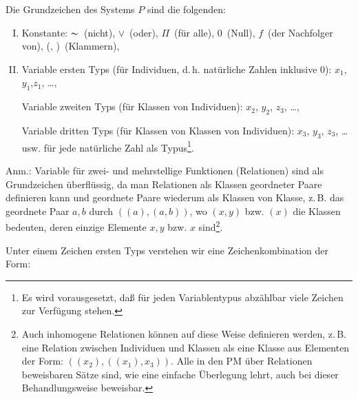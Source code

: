 \documentclass[draft]{scrartcl}
\begin{document}
\label{ersetzungdurchklassen}
Die Grundzeichen des Systems $P$ sind die folgenden:

\begin{enumerate}[I.]
	\item Konstante: \glqq $\thicksim$\grqq\ (nicht),
		\glqq$\lor$\grqq\ (oder), \glqq$\Pi{}$\grqq\ (für alle),
		\glqq $0$\grqq\ (Null), \glqq$f$\grqq\ (der Nachfolger
		von), \glqq(\grqq, \glqq)\grqq\ (Klammern),

	\item Variable ersten Typs (für Individuen, d.\,h. 
		natürliche Zahlen inklusive 0):
		\glqq$x_1$\grqq, \glqq$y_1$\grqq,\glqq$z_1$\grqq, \dots,

		Variable zweiten Typs (für Klassen von Individuen):
		\glqq$x_2$\grqq, \glqq$y_2$\grqq, \glqq$z_3$\grqq, \dots,

		Variable dritten Typs (für Klassen von Klassen von
		Individuen): \glqq$x_3$\grqq, \glqq$y_3$\grqq,
		\glqq$z_3$\grqq, \dots usw. für jede natürliche Zahl
		als Typus\footnote{Es wird vorausgesetzt, daß für
		jeden Variablentypus abzählbar viele Zeichen zur Verfügung stehen.}.
\end{enumerate}

Anm.: Variable für zwei- und mehrstellige Funktionen
(Relationen) sind als Grundzeichen überflüssig, da man
Relationen als Klassen geordneter Paare definieren kann
und geordnete Paare wiederum als Klassen von Klasse, z.\,B.
das geordnete Paar $a, b$ durch $\left(\left(a\right),
\left(a, b\right)\right)$, wo $\left(x, y\right)$ bzw. $\left(x\right)$ die
Klassen bedeuten, deren einzige Elemente $x, y$ bzw. $x$
sind\footnote{Auch inhomogene Relationen können auf diese
Weise definieren werden, z.\,B. eine Relation zwischen
Individuen und Klassen als eine Klasse aus Elementen
der Form: $\left(\left(x_2\right), \left(\left(x_1\right), x_3\right)\right)$.
Alle in den PM über Relationen beweisbaren Sätze sind, wie eine
einfache Überlegung lehrt, auch bei dieser Behandlungsweise beweisbar.}.

Unter einem Zeichen ersten Typs verstehen wir eine Zeichenkombination der Form:
\end{document}
